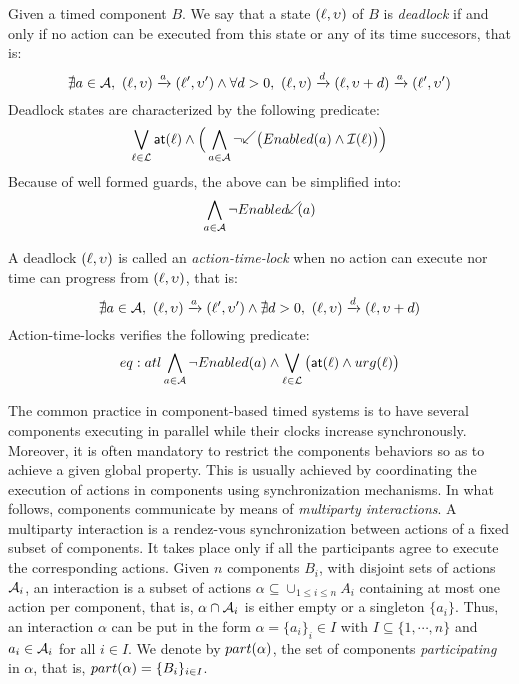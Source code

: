 \begin{definition}[Deadlocks]\label{def:dl}
  Given a timed component $B$. We say that a state $(\ell,\upsilon)$ of $B$ is 
  \emph{deadlock} if and only if no action can be executed from this state
  or any of its time succesors, that is:
  \begin{displaymath}
    \nexists a\in\mc{A}, \ (\loc,\val)\transit{a}(\loc',\val')\wedge
    \forall d>0, \ (\loc,\val)\transit{d}(\loc,\val+d)\transit{a}(\loc',\val')
  \end{displaymath}
  Deadlock states are characterized by the following predicate:
  \begin{displaymath}
    \bigvee_{\loc\in\Loc}\al{\loc}\wedge\Big(\bigwedge_{a\in\mc{A}}
    \neg \backward\big(\enabled{a}\wedge\Inv{\loc}\big)\Big)
  \end{displaymath}
  Because of well formed guards, the above can be simplified into:
  \begin{equation}\label{eq:dl}
    \bigwedge_{a\in\mc{A}}\neg\enabledbackward{a}
  \end{equation}
\end{definition}
A deadlock $(\ell,\upsilon)$ is called an \emph{action-time-lock} when no action can
execute nor time can progress from $(\ell,\upsilon)$, that is:
  \begin{displaymath}
    \nexists a\in\mc{A}, \ (\loc,\val)\transit{a}(\loc',\val')\wedge
    \nexists d>0, \ (\loc,\val)\transit{d}(\loc,\val+d)
  \end{displaymath}
  Action-time-locks verifies the following predicate:
  \begin{equation}{eq:atl}
    \bigwedge_{a\in\mathcal{A}}\neg Enabled(a)\wedge\bigvee_{\ell\in\mathcal{L}}
    \big(\textsf{at}(\ell)\wedge urg(\ell)\big)
  \end{equation}

The common practice in component-based timed systems is to have several components
executing in parallel while their clocks increase synchronously. Moreover,
it is often mandatory to restrict the components behaviors so as to achieve 
a given global property. This is usually achieved by coordinating the execution of 
actions in components using synchronization mechanisms.
In what follows, components communicate by means
of \emph{multiparty interactions}. A multiparty interaction is a rendez-vous 
synchronization between actions of a fixed subset of components. It takes place 
only if all the participants agree to execute the corresponding actions. Given 
$n$ components $B_i$, with disjoint sets of actions $\mathcal{A}_i$, an interaction
is a subset of actions $\alpha\subseteq\cup_{1\le i\le n}A_i$ containing at most
one action per component, that is, $\alpha\cap\mathcal{A}_i$ is either empty or a 
singleton $\{a_i\}$. Thus, an interaction $\alpha$ can be put in the form
$\alpha=\{a_i\}_i{\in{I}}$ with $I\subseteq\{1,\cdots,n\}$ and $a_i\in\mathcal{A}_i$
for all $i\in{I}$. We denote by $part(\alpha)$, the set of components \emph{participating}
in $\alpha$, that is, $part(\alpha)=\{B_i\}_{i\in{I}}$.

